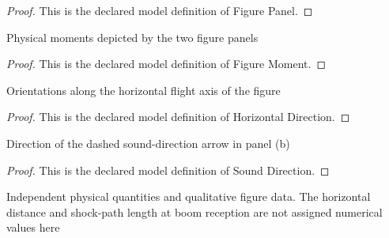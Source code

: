 \begin{proof}
  This is the declared model definition of Figure Panel.
\end{proof}
\begin{definition}
  \label{def:physics:phyx-mini-0221:phyxminiproblems-problemphyxmini0221-figuremoment}
  Physical moments depicted by the two figure panels
\end{definition}
\begin{proof}
  This is the declared model definition of Figure Moment.
\end{proof}
\begin{definition}
  \label{def:physics:phyx-mini-0221:phyxminiproblems-problemphyxmini0221-horizontaldirection}
  Orientations along the horizontal flight axis of the figure
\end{definition}
\begin{proof}
  This is the declared model definition of Horizontal Direction.
\end{proof}
\begin{definition}
  \label{def:physics:phyx-mini-0221:phyxminiproblems-problemphyxmini0221-sounddirection}
  Direction of the dashed sound-direction arrow in panel (b)
\end{definition}
\begin{proof}
  This is the declared model definition of Sound Direction.
\end{proof}
\begin{definition}
  \label{def:physics:phyx-mini-0221:phyxminiproblems-problemphyxmini0221-sonicboomsetup}
  Independent physical quantities and qualitative figure data. The horizontal distance and shock-path length at boom reception are not assigned numerical values here
\end{definition}
